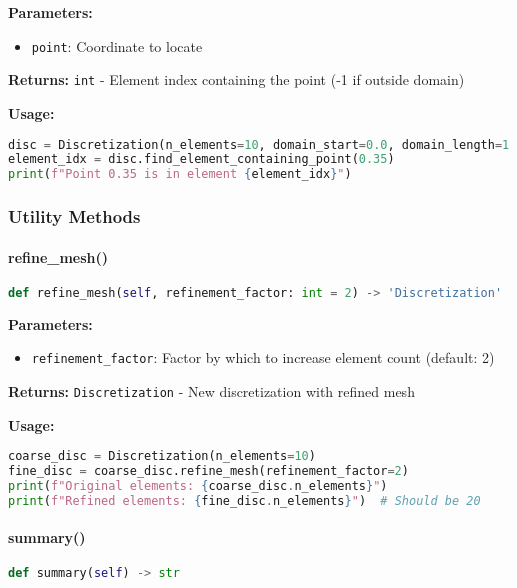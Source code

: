 \textbf{Parameters:}
\begin{itemize}
    \item \texttt{point}: Coordinate to locate
\end{itemize}

\textbf{Returns:} \texttt{int} - Element index containing the point (-1 if outside domain)

\textbf{Usage:}
\begin{lstlisting}[language=Python, caption=Find Element Usage]
disc = Discretization(n_elements=10, domain_start=0.0, domain_length=1.0)
element_idx = disc.find_element_containing_point(0.35)
print(f"Point 0.35 is in element {element_idx}")
\end{lstlisting}

\subsubsection{Utility Methods}

\paragraph{refine\_mesh()}
\begin{lstlisting}[language=Python, caption=Refine Mesh Method]
def refine_mesh(self, refinement_factor: int = 2) -> 'Discretization'
\end{lstlisting}

\textbf{Parameters:}
\begin{itemize}
    \item \texttt{refinement\_factor}: Factor by which to increase element count (default: 2)
\end{itemize}

\textbf{Returns:} \texttt{Discretization} - New discretization with refined mesh

\textbf{Usage:}
\begin{lstlisting}[language=Python, caption=Mesh Refinement Usage]
coarse_disc = Discretization(n_elements=10)
fine_disc = coarse_disc.refine_mesh(refinement_factor=2)
print(f"Original elements: {coarse_disc.n_elements}")
print(f"Refined elements: {fine_disc.n_elements}")  # Should be 20
\end{lstlisting}

\paragraph{summary()}\leavevmode
\begin{lstlisting}[language=Python, caption=Discretization Summary Method]
def summary(self) -> str
\end{lstlisting}

